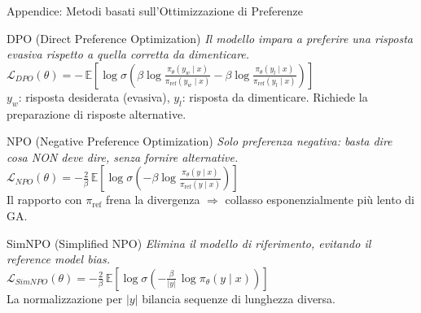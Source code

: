 \documentclass[aspectratio=169,11pt]{beamer}
\begin{document}
\begin{frame}{Appendice: Metodi basati sull'Ottimizzazione di Preferenze}
  \scriptsize
  \begin{block}{DPO (Direct Preference Optimization)}
    \textit{Il modello impara a preferire una risposta evasiva rispetto a quella corretta da dimenticare.}\\[0.3em]
    $\mathcal{L}_{DPO}(\theta) = -\,\mathbb{E}\!\left[\log \sigma\!\left(\beta \log \frac{\pi_\theta(y_w \mid x)}{\pi_{\mathrm{ref}}(y_w \mid x)} - \beta \log \frac{\pi_\theta(y_l \mid x)}{\pi_{\mathrm{ref}}(y_l \mid x)}\right)\right]$\\[0.3em]
    {\tiny $y_w$: risposta desiderata (evasiva), $y_l$: risposta da dimenticare. Richiede la preparazione di risposte alternative.}
  \end{block}
  \vspace{-0.3em}
  \begin{block}{NPO (Negative Preference Optimization)}
    \textit{Solo preferenza negativa: basta dire cosa NON deve dire, senza fornire alternative.}\\[0.3em]
    $\mathcal{L}_{NPO}(\theta) = -\frac{2}{\beta}\,\mathbb{E}\!\left[\log \sigma\!\left(-\beta \log \frac{\pi_\theta(y \mid x)}{\pi_{\mathrm{ref}}(y \mid x)}\right)\right]$\\[0.3em]
    {\tiny Il rapporto con $\pi_{\mathrm{ref}}$ frena la divergenza $\Rightarrow$ collasso esponenzialmente pi\`u lento di GA.}
  \end{block}
  \vspace{-0.3em}
  \begin{block}{SimNPO (Simplified NPO)}
    \textit{Elimina il modello di riferimento, evitando il reference model bias.}\\[0.3em]
    $\mathcal{L}_{SimNPO}(\theta) = -\frac{2}{\beta}\,\mathbb{E}\!\left[\log \sigma\!\left(-\frac{\beta}{|y|}\, \log \pi_\theta(y \mid x)\right)\right]$\\[0.3em]
    {\tiny La normalizzazione per $|y|$ bilancia sequenze di lunghezza diversa.}
  \end{block}
\end{frame}
\end{document}
